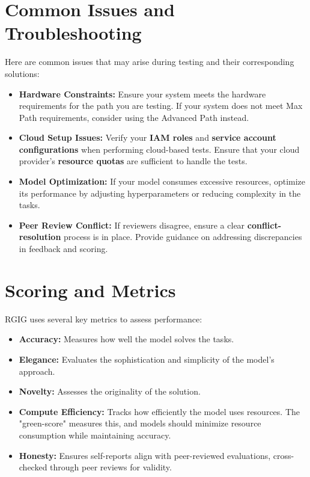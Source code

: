 \section*{Common Issues and Troubleshooting}
Here are common issues that may arise during testing and their corresponding solutions:

\begin{itemize}
  \item \textbf{Hardware Constraints:} Ensure your system meets the hardware requirements for the path you are testing. If your system does not meet Max Path requirements, consider using the Advanced Path instead.
  \item \textbf{Cloud Setup Issues:} Verify your \textbf{IAM roles} and \textbf{service account configurations} when performing cloud-based tests. Ensure that your cloud provider's \textbf{resource quotas} are sufficient to handle the tests.
  \item \textbf{Model Optimization:} If your model consumes excessive resources, optimize its performance by adjusting hyperparameters or reducing complexity in the tasks.
  \item \textbf{Peer Review Conflict:} If reviewers disagree, ensure a clear \textbf{conflict-resolution} process is in place. Provide guidance on addressing discrepancies in feedback and scoring.
\end{itemize}

\section*{Scoring and Metrics}
RGIG uses several key metrics to assess performance:

\begin{itemize}
  \item \textbf{Accuracy:} Measures how well the model solves the tasks.
  \item \textbf{Elegance:} Evaluates the sophistication and simplicity of the model's approach.
  \item \textbf{Novelty:} Assesses the originality of the solution.
  \item \textbf{Compute Efficiency:} Tracks how efficiently the model uses resources. The "green-score" measures this, and models should minimize resource consumption while maintaining accuracy.
  \item \textbf{Honesty:} Ensures self-reports align with peer-reviewed evaluations, cross-checked through peer reviews for validity.
\end{itemize}


